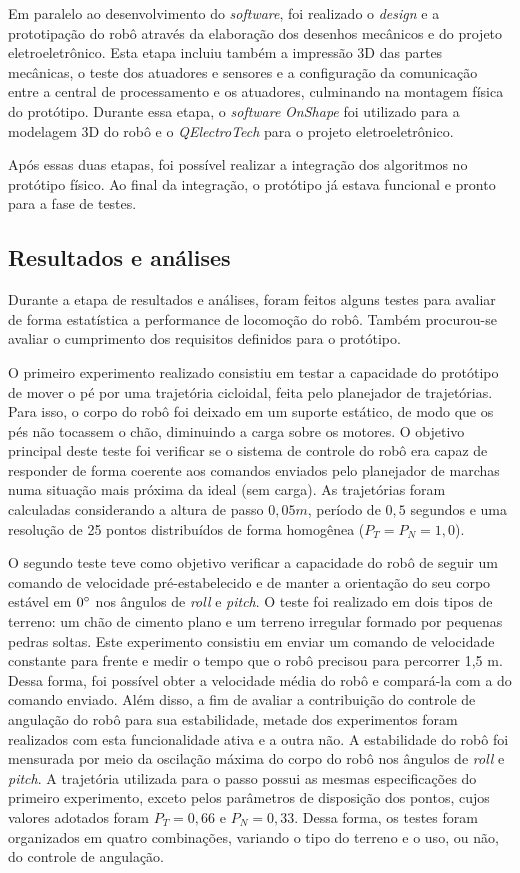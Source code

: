 \documentclass[../main.tex]{subfiles}
\begin{document}
  Em paralelo ao desenvolvimento do \textit{software}, foi realizado o \textit{design} e a prototipação do robô através da elaboração dos desenhos mecânicos e do projeto eletroeletrônico. Esta etapa incluiu também a impressão 3D das partes mecânicas, o teste dos atuadores e sensores e a configuração da comunicação entre a central de processamento e os atuadores, culminando na montagem física do protótipo. Durante essa etapa, o \textit{software} \textit{OnShape} foi utilizado para a modelagem 3D do robô e o \textit{QElectroTech} para o projeto eletroeletrônico.

  Após essas duas etapas, foi possível realizar a integração dos algoritmos no protótipo físico. Ao final da integração, o protótipo já estava funcional e pronto para a fase de testes.

  \subsection{Resultados e análises}
  Durante a etapa de resultados e análises, foram feitos alguns testes para avaliar de forma estatística a performance de locomoção do robô. Também procurou-se avaliar o cumprimento dos requisitos definidos para o protótipo.

  O primeiro experimento realizado consistiu em testar a capacidade do protótipo de mover o pé por uma trajetória cicloidal, feita pelo planejador de trajetórias. Para isso, o corpo do robô foi deixado em um suporte estático, de modo que os pés não tocassem o chão, diminuindo a carga sobre os motores. O objetivo principal deste teste foi verificar se o sistema de controle do robô era capaz de responder de forma coerente aos comandos enviados pelo planejador de marchas numa situação mais próxima da ideal (sem carga). As trajetórias foram calculadas considerando a altura de passo $0,05m$, período de $0,5$ segundos e uma resolução de 25 pontos distribuídos de forma homogênea ($P_T = P_N = 1,0$).
  
  O segundo teste teve como objetivo verificar a capacidade do robô de seguir um comando de velocidade pré-estabelecido e de manter a orientação do seu corpo estável em $0\degree$ nos ângulos de \textit{roll} e \textit{pitch}. O teste foi realizado em dois tipos de terreno: um chão de cimento plano e um terreno irregular formado por pequenas pedras soltas. Este experimento consistiu em enviar um comando de velocidade constante para frente e medir o tempo que o robô precisou para percorrer 1,5 m. Dessa forma, foi possível obter a velocidade média do robô e compará-la com a do comando enviado. Além disso, a fim de avaliar a contribuição do controle de angulação do robô para sua estabilidade, metade dos experimentos foram realizados com esta funcionalidade ativa e a outra não. A estabilidade do robô foi mensurada por meio da oscilação máxima do corpo do robô nos ângulos de \textit{roll} e \textit{pitch}. A trajetória utilizada para o passo possui as mesmas especificações do primeiro experimento, exceto pelos parâmetros de disposição dos pontos, cujos valores adotados foram $P_T = 0,66$ e $P_N = 0,33$. Dessa forma, os testes foram organizados em quatro combinações, variando o tipo do terreno e o uso, ou não, do controle de angulação.
  
\end{document}

